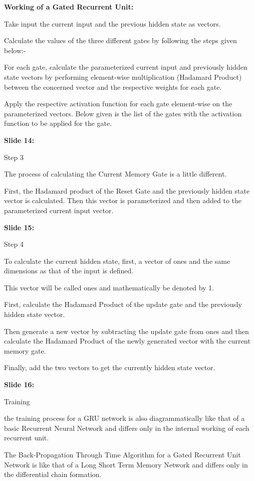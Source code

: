 \documentclass[11pt,a4paper]{article}
\begin{document}
\textbf{Working of a Gated Recurrent Unit:} 

Take input the current input and the previous hidden state as vectors.

Calculate the values of the three different gates by following the steps given below:-

For each gate, calculate the parameterized current input and previously hidden state vectors by performing element-wise multiplication (Hadamard Product) between the concerned vector and the respective weights for each gate.

Apply the respective activation function for each gate element-wise on the parameterized vectors. Below given is the list of the gates with the activation function to be applied for the gate.

\textbf{Slide 14:}

Step 3

The process of calculating the Current Memory Gate is a little different.

First, the Hadamard product of the Reset Gate and the previously hidden state vector is calculated. Then this vector is parameterized and then added to the parameterized current input vector.

\textbf{Slide 15:}

Step 4

To calculate the current hidden state, first, a vector of ones and the same dimensions as that of the input is defined.

This vector will be called ones and mathematically be denoted by 1.

First, calculate the Hadamard Product of the update gate and the previously hidden state vector.

Then generate a new vector by subtracting the update gate from ones and then calculate the Hadamard Product of the newly generated vector with the current memory gate.

Finally, add the two vectors to get the currently hidden state vector.

\textbf{Slide 16:}

Training

the training process for a GRU network is also diagrammatically like that of a basic Recurrent Neural Network and differs only in the internal working of each recurrent unit.

The Back-Propagation Through Time Algorithm for a Gated Recurrent Unit Network is like that of a Long Short Term Memory Network and differs only in the differential chain formation.
\end{document}
